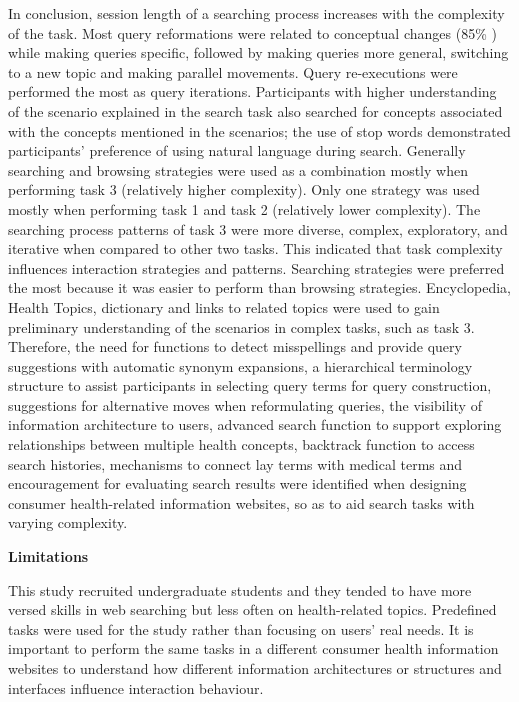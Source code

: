 \documentclass[]{article}
\begin{document}
In conclusion, session length of a searching process increases with the complexity of the task. Most query reformations were related to conceptual changes (85\% ) while making queries specific,  followed by making queries more general, switching to a new topic and making parallel movements. Query re-executions were performed the most as query iterations. Participants with higher understanding of the scenario explained in the search task also searched for concepts associated with the concepts mentioned in the scenarios; the use of stop words demonstrated participants' preference of using natural language during search. Generally searching and browsing strategies were used as a combination mostly when performing task 3 (relatively higher complexity). Only one strategy was used mostly when performing task 1 and task 2 (relatively lower complexity). The searching process patterns of task 3 were more diverse, complex, exploratory, and iterative when compared to other two tasks. This indicated that task complexity influences interaction strategies and patterns. Searching strategies were preferred the most because it was easier to perform than browsing strategies. Encyclopedia, Health Topics, dictionary and links to related topics were used to gain preliminary understanding of the scenarios in complex tasks, such as task 3. Therefore, the need for functions to detect misspellings and provide query suggestions with automatic synonym expansions, a hierarchical terminology structure to assist participants in selecting query terms for query construction, suggestions for alternative moves when reformulating queries, the visibility of information architecture to users, advanced search function to support exploring relationships between multiple health concepts, backtrack function to access search histories, mechanisms to connect lay terms with medical terms and encouragement for evaluating search results were identified when designing consumer health-related information websites, so as to aid search tasks with varying complexity.         

\textbf{Limitations}

This study recruited undergraduate students and they tended to have more versed skills in web searching but less often on health-related topics. Predefined tasks were used for the study rather than focusing on users’ real needs. It is important to perform the same tasks in a different consumer health information websites to understand how different information architectures or structures and interfaces influence interaction behaviour.
\end{document}
